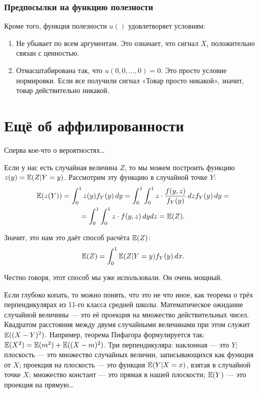\subsubsection*{Предпосылки на функцию полезности}
Кроме того, функция полезности $ u() $ удовлетворяет условиям:
\begin{enumerate}
\item Не убывает по всем аргументам. Это означает, что сигнал $ X_{i} $ положительно связан с ценностью.
\item Отмасштабирована так, что $ u(0,0,\ldots,0)=0 $. Это просто условие нормировки. Если все получили сигнал «Товар просто никакой», значит, товар действительно никакой.
\end{enumerate}






\section{Ещё об аффилированности}


Сперва кое-что о вероятностях\ldots

Если у нас есть случайная величина $ Z $, то мы можем построить функцию $z(y)= \operatorname{\mathbb{E}}(Z|Y=y) $. Рассмотрим эту функцию в случайной точке $ Y $:
\begin{multline}
\operatorname{\mathbb{E}}(z(Y))=\int_{0}^{1}z(y)f_{Y}(y) \, dy=\int_{0}^{1}\int_{0}^{1}z\cdot \frac{f(y,z)}{f_{Y}(y)} \, dz f_{Y}(y) \, dy=\\
=\int_{0}^{1}\int_{0}^{1}z\cdot f(y,z) \, dydz=\operatorname{\mathbb{E}}(Z).
\end{multline}

Значит, это нам это даёт способ расчёта $ \operatorname{\mathbb{E}}(Z) $:
\begin{equation}
\label{conditional_way}
\operatorname{\mathbb{E}}(Z)=\int_{0}^{1}\operatorname{\mathbb{E}}(Z|Y=y)f_{Y}(y) \, dx.
\end{equation}

Честно говоря, этот способ мы уже использовали. Он очень мощный.

Если глубоко копать, то можно понять, что это не что иное, как теорема о трёх перпендикулярах из 11-го класса средней школы. Математическое ожидание случайной величины — это её проекция на множество действительных чисел. Квадратом расстояния между двумя случайными величинами при этом служит $ \operatorname{\mathbb{E}}((X-Y)^{2}) $. Например, теорема Пифагора формулируется так: $ \operatorname{\mathbb{E}}(X^{2})=\operatorname{\mathbb{E}}(m^{2})+\operatorname{\mathbb{E}}((X-m)^{2}) $. Три перпендикуляра: наклонная — это $ Y $; плоскость — это множество случайных величин, записывающихся как функция от $ X $; проекция на плоскость — это функция $ \operatorname{\mathbb{E}}(Y|X=x) $, взятая в случайной точке $ X $; множество констант — это прямая в нашей плоскости; $ \operatorname{\mathbb{E}}(Y) $ — это проекция на прямую\ldots


